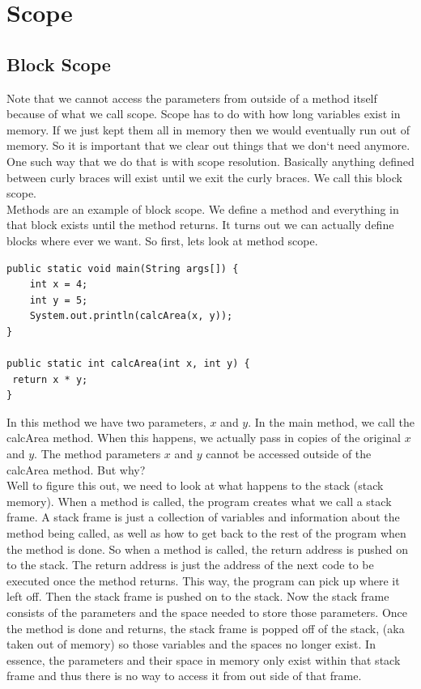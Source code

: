 \documentclass[11]{article}
\begin{document}
\section{Scope}
\subsection{Block Scope}
Note that we cannot access the parameters from outside of a method itself because of what we call scope. Scope has to do with how long variables exist in memory. If we just kept them all in memory then we would eventually run out of memory. So it is important that we clear out things that we don`t need anymore. One such way that we do that is with scope resolution. Basically anything defined between curly braces will exist until we exit the curly braces. We call this block scope.\\

Methods are an example of block scope. We define a method and everything in that block exists until the method returns. It turns out we can actually define blocks where ever we want. So first, lets look at method scope.

\begin{lstlisting}
public static void main(String args[]) {
	int x = 4;
	int y = 5;
	System.out.println(calcArea(x, y));
}

public static int calcArea(int x, int y) {
 return x * y;
}
\end{lstlisting}

In this method we have two parameters, $x$ and $y$. In the main method, we call the calcArea method. When this happens, we actually pass in copies of the original $x$ and $y$. The method parameters $x$ and $y$ cannot be accessed outside of the calcArea method. But why?\\

Well to figure this out, we need to look at what happens to the stack (stack memory). When a method is called, the program creates what we call a stack frame. A stack frame is just a collection of variables and information about the method being called, as well as how to get back to the rest of the program when the method is done. So when a method is called, the return address is pushed on to the stack. The return address is just the address of the next code to be executed once the method returns. This way, the program can pick up where it left off. Then the stack frame is pushed on to the stack. Now the stack frame consists of the parameters and the space needed to store those parameters. Once the method is done and returns, the stack frame is popped off of the stack, (aka taken out of memory) so those variables and the spaces no longer exist. In essence, the parameters and their space in memory only exist within that stack frame and thus there is no way to access it from out side of that frame.\\
\end{document}
